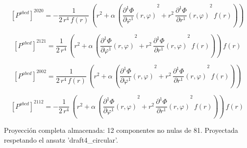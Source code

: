 \documentclass[11pt]{article}
\begin{document}
\begin{dmath*}[breakdepth={5}]
\left[P^{abcd}\right]^{2020} = -\frac{1}{2\,{r}^{4}\,f\!\left(r\right)}\,\left({r}^{2} + \alpha\,\left({\frac{\partial^{1} \Phi}{\partial \varphi^{1}}\!\left(r, \varphi\right)}^{2} + {r}^{2}\,{\frac{\partial^{1} \Phi}{\partial r^{1}}\!\left(r, \varphi\right)}^{2}\,f\!\left(r\right)\right)\right)
\end{dmath*}
\par\smallskip
\begin{dmath*}[breakdepth={5}]
\left[P^{abcd}\right]^{2121} = \frac{1}{2\,{r}^{4}}\,\left({r}^{2} + \alpha\,\left({\frac{\partial^{1} \Phi}{\partial \varphi^{1}}\!\left(r, \varphi\right)}^{2} + {r}^{2}\,{\frac{\partial^{1} \Phi}{\partial r^{1}}\!\left(r, \varphi\right)}^{2}\,f\!\left(r\right)\right)\right)\,f\!\left(r\right)
\end{dmath*}
\par\smallskip
\begin{dmath*}[breakdepth={5}]
\left[P^{abcd}\right]^{2002} = \frac{1}{2\,{r}^{4}\,f\!\left(r\right)}\,\left({r}^{2} + \alpha\,\left({\frac{\partial^{1} \Phi}{\partial \varphi^{1}}\!\left(r, \varphi\right)}^{2} + {r}^{2}\,{\frac{\partial^{1} \Phi}{\partial r^{1}}\!\left(r, \varphi\right)}^{2}\,f\!\left(r\right)\right)\right)
\end{dmath*}
\par\smallskip
\begin{dmath*}[breakdepth={5}]
\left[P^{abcd}\right]^{2112} = -\frac{1}{2\,{r}^{4}}\,\left({r}^{2} + \alpha\,\left({\frac{\partial^{1} \Phi}{\partial \varphi^{1}}\!\left(r, \varphi\right)}^{2} + {r}^{2}\,{\frac{\partial^{1} \Phi}{\partial r^{1}}\!\left(r, \varphi\right)}^{2}\,f\!\left(r\right)\right)\right)\,f\!\left(r\right)
\end{dmath*}
\par\smallskip
Proyección completa almacenada: 12 componentes no nulas de 81. Proyectada respetando el ansatz 'draft4\_circular'.\par\medskip
{}
\end{document}
